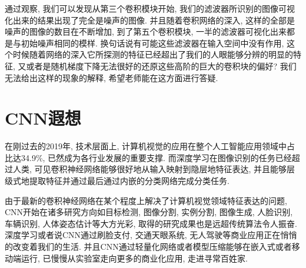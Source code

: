 \documentclass[lang=cn,11pt]{elegantpaper}
\begin{document}
通过观察, 我们可以发现从第三个卷积模块开始, 我们的滤波器所识别的图像可视化出来的结果出现了完全是噪声的图像. 并且随着卷积网络的深入, 这样的全部是噪声的图像的数目在不断增加, 到了第五个卷积模块, 一半的滤波器可视化出来都是与初始噪声相同的模样. 换句话说有可能这些滤波器在输入空间中没有作用, 这个时候随着网络的深入它所探测的特征已经超出了我们的人眼能够分辨的明显的特征, 又或者是随机梯度下降无法很好的还原这些高阶的巨大的卷积块的偏好? 我们无法给出这样的现象的解释, 希望老师能在这方面进行答疑.

\section{CNN遐想}
在刚过去的2019年, 技术层面上, 计算机视觉的应用在整个人工智能应用领域中占比达34.9\%, 已然成为各行业发展的重要支撑. 而深度学习在图像识别的任务已经超过人类, 可见卷积神经网络能够很好地从输入映射到隐层地特征表达, 并且能够层级式地提取特征并通过最后通过内嵌的分类网络完成分类任务. 

由于最新的卷积神经网络在某个程度上解决了计算机视觉领域特征表达的问题, CNN开始在诸多研究方向如目标检测, 图像分割, 实例分割, 图像生成, 人脸识别, 车辆识别, 人体姿态估计等大方光彩, 取得的研究成果也是远超传统算法令人振奋. 深度学习或者说CNN通过刷脸支付, 交通天眼系统, 无人驾驶等商业应用正在悄悄的改变着我们的生活. 并且CNN通过轻量化网络或者模型压缩能够在嵌入式或者移动端运行, 已慢慢从实验室走向更多的商业化应用, 走进寻常百姓家. 

\newpage
\nocite{*}



\end{document}
